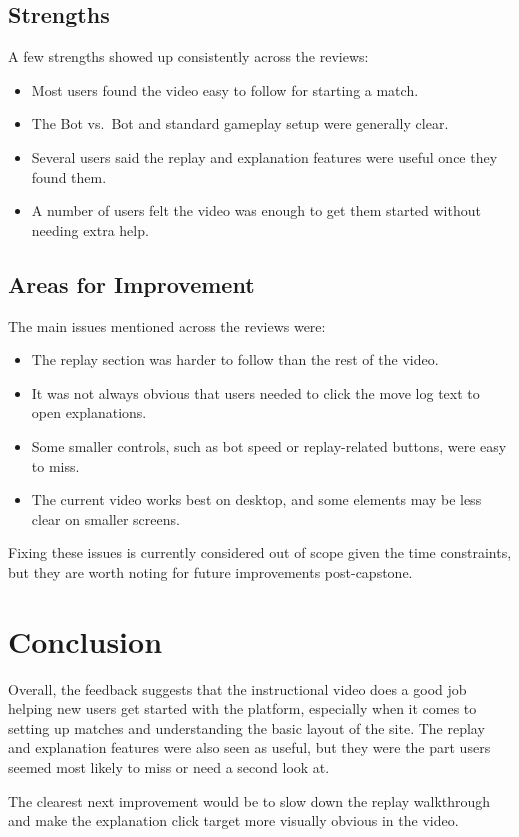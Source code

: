 \documentclass{article}
\begin{document}
\subsection{Strengths}

A few strengths showed up consistently across the reviews:

\begin{itemize}
    \item Most users found the video easy to follow for starting a match.
    \item The Bot vs.\ Bot and standard gameplay setup were generally clear.
    \item Several users said the replay and explanation features were useful once they found them.
    \item A number of users felt the video was enough to get them started without needing extra help.
\end{itemize}

\subsection{Areas for Improvement}

The main issues mentioned across the reviews were:

\begin{itemize}
    \item The replay section was harder to follow than the rest of the video.
    \item It was not always obvious that users needed to click the move log text to open explanations.
    \item Some smaller controls, such as bot speed or replay-related buttons, were easy to miss.
    \item The current video works best on desktop, and some elements may be less clear on smaller screens.
\end{itemize}

Fixing these issues is currently considered out of scope given the time constraints, but they are worth noting for future improvements post-capstone.

\section{Conclusion}

Overall, the feedback suggests that the instructional video does a good job helping
new users get started with the platform, especially when it comes to setting up
matches and understanding the basic layout of the site. The replay and explanation
features were also seen as useful, but they were the part users seemed most likely
to miss or need a second look at.

The clearest next improvement would be to slow down the replay walkthrough and
make the explanation click target more visually obvious in the video.
\end{document}
